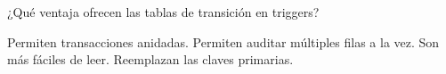 \question[1] ¿Qué ventaja ofrecen las tablas de transición en triggers?
\begin{choices}
\choice Permiten transacciones anidadas.
\CorrectChoice Permiten auditar múltiples filas a la vez.
\choice Son más fáciles de leer.
\choice Reemplazan las claves primarias.
\end{choices}